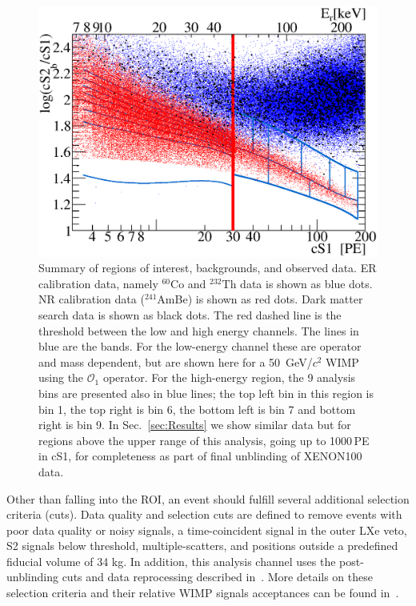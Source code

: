 \begin{figure}[]
\begin{minipage}{1\linewidth}
\centerline{\includegraphics[width=1\linewidth]{Figures/eft_sr.eps}}
\end{minipage}
\caption{Summary of regions of interest, backgrounds, and observed data. ER calibration data, namely $^{60}\mathrm{Co}$ and $^{232}\mathrm{Th}$ data is shown as blue dots. NR calibration data ($^{241}$AmBe) is shown as red dots. Dark matter search data is shown as black dots. The red dashed line is the threshold between the low and high energy channels. The lines in blue are the bands. For the low-energy channel these are operator and mass dependent, but are shown here for a 50~GeV/$c^2$ WIMP using the $\mathcal{O}_1$ operator. For the high-energy region, the 9 analysis bins are presented also in blue lines; the top left bin in this region is bin 1, the top right is bin 6, the bottom left is bin 7 and bottom right is bin 9. 
In Sec.~\ref{sec:Results} we show similar data but for regions above the upper range of this analysis, going up to 1000\,PE in cS1, for completeness as part of final unblinding of XENON100 data. 
}
\label{fig:phasespace}
\end{figure}  


Other than falling into the ROI, an event should fulfill several additional selection criteria (cuts). Data quality and selection cuts are defined to remove events with poor data quality or noisy signals, a time-coincident signal in the outer LXe veto, S2 signals below threshold, multiple-scatters, and positions outside a predefined fiducial volume of 34 kg. In addition, this analysis channel uses the post-unblinding cuts and data reprocessing described in~\cite{xe100_run_combination}. More details on these selection criteria and their relative WIMP signals acceptances can be found in~\cite{Aprile:2012vw,xe100_run_combination}. 


